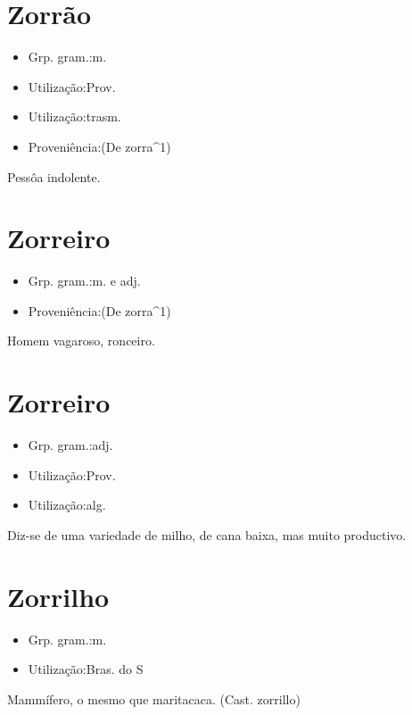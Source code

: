 \section{Zorrão}
\begin{itemize}
\item {Grp. gram.:m.}
\end{itemize}
\begin{itemize}
\item {Utilização:Prov.}
\end{itemize}
\begin{itemize}
\item {Utilização:trasm.}
\end{itemize}
\begin{itemize}
\item {Proveniência:(De \textunderscore zorra\textunderscore ^1)}
\end{itemize}
Pessôa indolente.
\section{Zorreiro}
\begin{itemize}
\item {Grp. gram.:m.  e  adj.}
\end{itemize}
\begin{itemize}
\item {Proveniência:(De \textunderscore zorra\textunderscore ^1)}
\end{itemize}
Homem vagaroso, ronceiro.
\section{Zorreiro}
\begin{itemize}
\item {Grp. gram.:adj.}
\end{itemize}
\begin{itemize}
\item {Utilização:Prov.}
\end{itemize}
\begin{itemize}
\item {Utilização:alg.}
\end{itemize}
Diz-se de uma variedade de milho, de cana baixa, mas muito productivo.
\section{Zorrilho}
\begin{itemize}
\item {Grp. gram.:m.}
\end{itemize}
\begin{itemize}
\item {Utilização:Bras. do S}
\end{itemize}
Mammífero, o mesmo que \textunderscore maritacaca\textunderscore .
(Cast. \textunderscore zorrillo\textunderscore )

